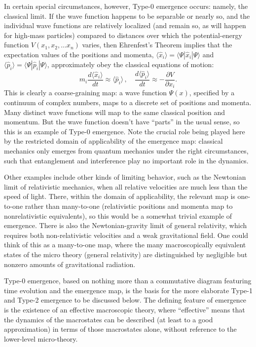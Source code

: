 \documentclass[12pt,english]{article}
\newcommand{\bra}[1]{\langle #1 |}
\newcommand{\be}{\begin{equation}}
\newcommand{\ee}{\end{equation}}
\begin{document}
In certain special circumstances, however, Type-0 emergence occurs: namely, the classical limit.
If the wave function happens to be separable or nearly so, and the individual wave functions are relatively localized (and remain so, as will happen for high-mass particles) compared to distances over which the potential-energy function $V(x_1, x_2, \ldots x_n)$ varies, then Ehrenfest's Theorem implies that the expectation values of the positions and momenta, $\langle \hat{x}_i\rangle=\bra{\Psi}\hat{x}_i|\Psi\rangle$ and $\langle \hat{p}_i\rangle=\bra{\Psi}\hat{p}_i|\Psi\rangle$, approximately obey the classical equations of motion:
\be
 m_i \frac{d\langle\hat{x}_i\rangle}{dt} \approx \langle\hat{p}_i\rangle\, , \quad
 \frac{d\langle\hat{p}_i\rangle}{dt} \approx - \frac{\partial V}{\partial x_i}.
\ee
This is clearly a coarse-graining map: a wave function $\Psi(x)$, specified by a continuum of complex numbers, maps to a discrete set of positions and momenta.
Many distinct wave functions will map to the same classical position and momentum.
But the wave function doesn't have ``parts'' in the usual sense, so this is an example of Type-0 emergence.
Note the crucial role being played here by the restricted domain of applicability of the emergence map: classical mechanics only emerges from quantum mechanics under the right circumstances, such that entanglement and interference play no important role in the dynamics.

Other examples include other kinds of limiting behavior, such as the Newtonian limit of relativistic mechanics, when all relative velocities are much less than the speed of light.
There, within the domain of applicability, the relevant map is one-to-one rather than many-to-one (relativistic positions and momenta map to nonrelativistic equivalents), so this would be a somewhat trivial example of emergence.
There is also the Newtonian-gravity limit of general relativity, which requires both non-relativistic velocities and a weak gravitational field.
One could think of this as a many-to-one map, where the many macroscopically equivalent states of the micro theory (general relativity) are distinguished by negligible but nonzero amounts of gravitational radiation.

Type-0 emergence, based on nothing more than a commutative diagram featuring time evolution and the emergence map, is the basis for the more elaborate Type-1 and Type-2 emergence to be discussed below.
The defining feature of emergence is the existence of an effective macroscopic theory, where ``effective'' means that the dynamics of the macrostates can be described (at least to a good approximation) in terms of those macrostates alone, without reference to the lower-level micro-theory. 
\end{document}
